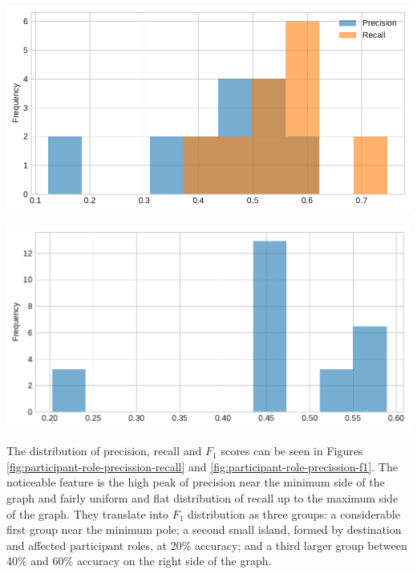     \vspace{1em}
    \noindent
    \begin{minipage}[b]{0.49\textwidth}
        \centering
        \includegraphics[width=\textwidth]{evaluation-results/figures/PARTICIPANT-ROLE-distribution-PR-10.pdf}
        \label{fig:participant-role-precission-recall}
    \end{minipage}
    \quad
    \begin{minipage}[b]{0.49\textwidth}
        \centering
        \includegraphics[width=\textwidth]{evaluation-results/figures/PARTICIPANT-ROLE-distribution-F1-10.pdf}
        \label{fig:participant-role-precission-f1}
    \end{minipage}
    \vspace{1em}
    
     The distribution of precision, recall and $F_1$ scores can be seen in Figures \ref{fig:participant-role-precission-recall} and \ref{fig:participant-role-precission-f1}. The  noticeable feature is the high peak of precision near the minimum side of the graph and fairly uniform and flat distribution of recall up to the maximum side of the graph. They translate into $F_1$ distribution as three groups: a considerable first group near the minimum pole; a second small island, formed by destination and affected participant roles, at 20\% accuracy; and a third larger group between 40\% and 60\% accuracy on the right side of the graph.
    
